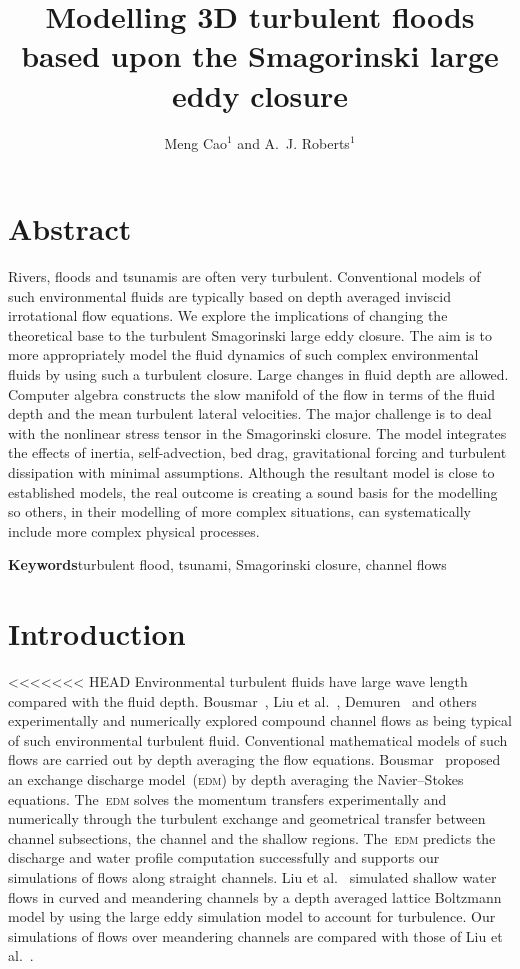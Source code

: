 \documentclass[twocolumn]{afmc_art}
\title{Modelling 3D turbulent floods based upon the Smagorinski large eddy closure}
\author{Meng Cao$^1$ and A.~J. Roberts$^1$}
\affiliation{$^1$School of Mathematical Sciences\\
                University of Adelaide, South Australia 5005, Australia\\[5pt]
            }
\begin{document}
    
\maketitle

\section{Abstract}
Rivers, floods and tsunamis are often very turbulent.
Conventional models of such environmental fluids are typically based on depth averaged inviscid irrotational flow equations.
We explore the implications of changing the theoretical base to the turbulent Smagorinski large eddy closure.
The aim is to more appropriately model the fluid dynamics of such complex environmental fluids by using such a turbulent closure.
Large changes in fluid depth are allowed.
Computer algebra constructs the slow manifold of the flow in terms of the fluid depth and the mean turbulent lateral velocities.
The major challenge is to deal with the nonlinear stress tensor in the Smagorinski closure.
The model integrates the effects of inertia, self-advection, bed drag, gravitational forcing and turbulent dissipation with minimal assumptions.
Although the resultant model is close to established models, the real outcome is creating a sound basis for the modelling so others, in their modelling of more complex situations, can systematically include more complex physical processes.

\textbf{Keywords}\quad turbulent flood, tsunami, Smagorinski closure, channel flows

\section{Introduction}

<<<<<<< HEAD
Environmental turbulent fluids have large wave length compared with the fluid depth.
Bousmar~\cite{Bousmar2002}, Liu et al.~\cite{Liu2009}, Demuren~\cite{Demuren1993} and others experimentally and numerically explored compound channel flows as being typical of such environmental turbulent fluid.
Conventional mathematical models of such flows are carried out by depth averaging the flow equations. 
Bousmar~\cite{Bousmar2002} proposed an exchange discharge model~(\textsc{edm}) by depth averaging the Navier--Stokes equations.
The~\textsc{edm} solves the momentum transfers experimentally and numerically through the turbulent exchange and geometrical transfer between channel subsections, the channel and the shallow regions.
The~\textsc{edm} predicts the discharge and water profile computation successfully and supports our simulations of flows along straight channels. 
Liu et al.~\cite{Liu2009} simulated shallow water flows in curved and meandering channels by a depth averaged lattice Boltzmann model by using the large eddy simulation model to account for turbulence.
Our simulations of flows over meandering channels are compared with those of Liu et al.~\cite{Liu2009}. 
\end{document}
